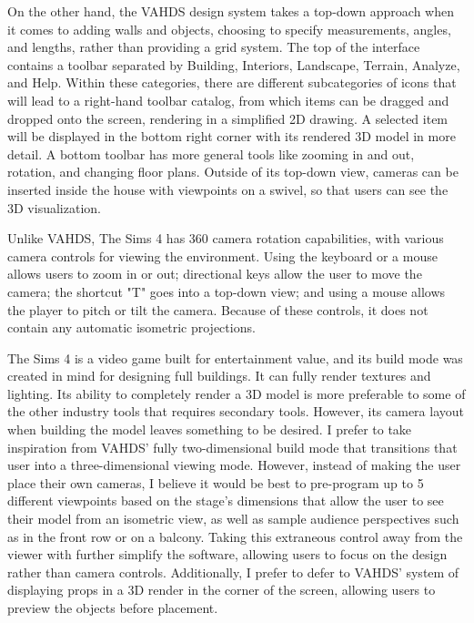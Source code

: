 \documentclass[10pt,twocolumn]{article}
\begin{document}
On the other hand, the VAHDS design system takes a top-down approach when it comes to adding walls and objects, choosing to specify measurements, angles, and lengths, rather than providing a grid system. The top of the interface contains a toolbar separated by Building, Interiors, Landscape, Terrain, Analyze, and Help. Within these categories, there are different subcategories of icons that will lead to a right-hand toolbar catalog, from which items can be dragged and dropped onto the screen, rendering in a simplified 2D drawing. A selected item will be displayed in the bottom right corner with its rendered 3D model in more detail. A bottom toolbar has more general tools like zooming in and out, rotation, and changing floor plans. Outside of its top-down view, cameras can be inserted inside the house with viewpoints on a swivel, so that users can see the 3D visualization. 

Unlike VAHDS, The Sims 4 has 360 camera rotation capabilities, with various camera controls for viewing the environment. Using the keyboard or a mouse allows users to zoom in or out; directional keys allow the user to move the camera; the shortcut "T" goes into a top-down view; and using a mouse allows the player to pitch or tilt the camera. Because of these controls, it does not contain any automatic isometric projections.

The Sims 4 is a video game built for entertainment value, and its build mode was created in mind for designing full buildings. It can fully render textures and lighting. Its ability to completely render a 3D model is more preferable to some of the other industry tools that requires secondary tools. However, its camera layout when building the model leaves something to be desired. I prefer to take inspiration from VAHDS' fully two-dimensional build mode that transitions that user into a three-dimensional viewing mode. However, instead of making the user place their own cameras, I believe it would be best to pre-program up to 5 different viewpoints based on the stage's dimensions that allow the user to see their model from an isometric view, as well as sample audience perspectives such as in the front row or on a balcony. Taking this extraneous control away from the viewer with further simplify the software, allowing users to focus on the design rather than camera controls. Additionally, I prefer to defer to VAHDS' system of displaying props in a 3D render in the corner of the screen, allowing users to preview the objects before placement. 
\end{document}
